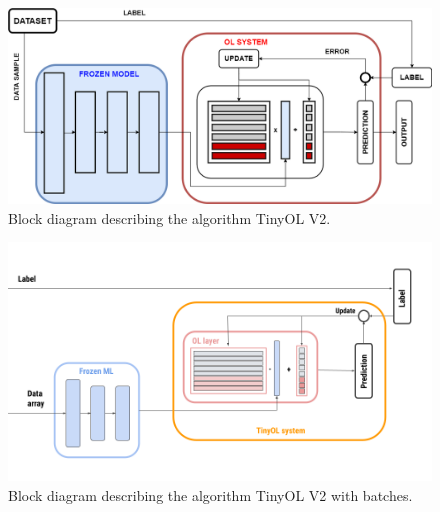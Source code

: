 \documentclass[12pt]{report}
\begin{document}
\begin{figure}[h!]
    \centering
    \includegraphics[width=120mm]{Figures/Chapter3/OLV2_.png} 
    \caption{Block diagram describing the algorithm TinyOL V2.}
    \label{fig:block_diag_OLV2}    
\end{figure}

\begin{figure}[h!]
    \centering
    \includegraphics[width=120mm]{Figures/Chapter3/OLV2.png} 
    \caption{Block diagram describing the algorithm TinyOL V2 with batches.}
    \label{fig:block_diag_OLV2wb}    
\end{figure}
\end{document}
